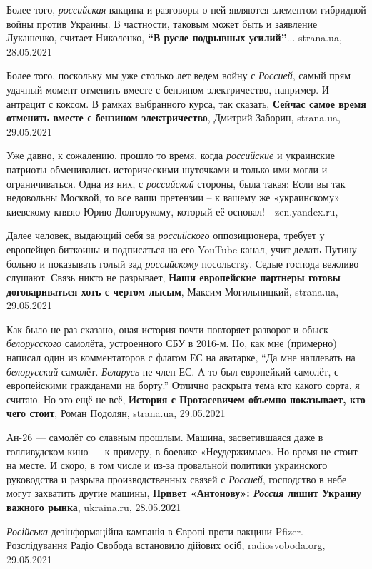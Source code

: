 Более того, \emph{российская} вакцина и разговоры о ней являются элементом
гибридной войны против Украины. В частности, таковым может быть и заявление
Лукашенко, считает Николенко, \textbf{\enquote{В русле подрывных усилий}}...
strana.ua, 28.05.2021

Более того, поскольку мы уже столько лет ведем войну с \emph{Россией}, самый
прям удачный момент отменить вместе с бензином электричество, например. И
антрацит с коксом. В рамках выбранного курса, так сказать, \textbf{Сейчас самое
время отменить вместе с бензином электричество}, Дмитрий Заборин, strana.ua,
29.05.2021

Уже давно, к сожалению, прошло то время, когда \emph{российские} и украинские патриоты
обменивались историческими шуточками и только ими могли и ограничиваться. Одна
из них, с \emph{российской} стороны, была такая:
Если вы так недовольны Москвой, то все ваши претензии – к вашему же
«украинскому» киевскому князю Юрию Долгорукому, который её основал! - zen.yandex.ru, 

Далее человек, выдающий себя за \emph{российского} оппозиционера, требует у
европейцев биткоины и подписаться на его YouTube-канал, учит делать Путину
больно и показывать голый зад \emph{российскому} посольству. Седые господа
вежливо слушают.  Связь никто не разрывает, \textbf{Наши европейские партнеры
готовы договариваться хоть с чертом лысым}, Максим Могильницкий, strana.ua,
29.05.2021

Как было не раз сказано, оная история почти повторяет разворот и обыск
\emph{белорусского} самолёта, устроенного СБУ в 2016-м. Но, как мне (примерно)
написал один из комментаторов с флагом ЕС на аватарке, \enquote{Да мне
наплевать на \emph{белорусский} самолёт. \emph{Беларусь} не член ЕС. А то был
европейкий самолёт, с европейскими гражданами на борту.} Отлично раскрыта тема
кто какого сорта, я считаю.  Но это ещё не всё, \textbf{История с Протасевичем
объемно показывает, кто чего стоит}, Роман Подолян, strana.ua, 29.05.2021

Ан-26 — самолёт со славным прошлым. Машина, засветившаяся даже в голливудском
кино — к примеру, в боевике «Неудержимые».  Но время не стоит на месте. И
скоро, в том числе и из-за провальной политики украинского руководства и
разрыва производственных связей с \emph{Россией}, господство в небе могут
захватить другие машины, \textbf{Привет «Антонову»: \emph{Россия} лишит Украину
важного рынка}, ukraina.ru, 28.05.2021

\emph{Російська} дезінформаційна кампанія в Європі проти вакцини Pfizer.
Розслідування Радіо Свобода встановило дійових осіб, radiosvoboda.org,
29.05.2021

